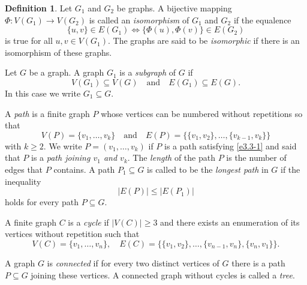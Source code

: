 \documentclass[11pt]{article}
\theoremstyle{definition}
\newtheorem{definition}[theorem]{Definition}
\theoremstyle{remark}
\numberwithin{equation}{section}
\begin{document}
 

\begin{definition}\label{776dcg}
Let $G_1$ and $G_2$ be graphs. A bijective mapping \linebreak
$\Phi \colon V(G_1)\to V(G_2)$
is called an {\it isomorphism} of $G_1$ and $G_2$ if the equalence 
\begin{equation*}
\{u,v\}\in E(G_1)\iff \{\Phi (u),\Phi (v)\}\in E(G_2)
\end{equation*}
is true for all $u,v\in V(G_1)$. 
The graphs are said to be  {\it isomorphic} if there is an isomorphism of these graphs.
\end{definition}





Let $G$ be a graph.
A graph \(G_1\) is a \emph{subgraph} of \(G\) if
\[
V(G_1) \subseteq V(G) \quad \text{and} \quad E(G_1) \subseteq E(G).
\]
In this case we  write \(G_1 \subseteq G\). 




A \emph{path} is a finite graph \(P\) whose vertices can be numbered without repetitions so that
\begin{equation}\label{e3.3-1}
V(P) = \{v_1, \ldots, v_k\} \quad \text{and} \quad E(P) = \{\{v_1, v_2\}, \ldots, \{v_{k-1}, v_k\}\}
\end{equation}
with \(k \geqslant 2\). We write \(P = (v_1, \ldots, v_k)\)  if \(P\) is a path satisfying \eqref{e3.3-1} and said that \(P\) is a \emph{path joining \(v_1\) and \(v_k\)}. 
The {\it length} of the path $P$ is the number of edges that $P$ contains. 
A path $P_1 \subseteq G$ is called to be the {\it longest path} in $G$ if the inequality  
\begin{equation*}
|E(P)| \leq |E(P_1)|
\end{equation*}
holds for every path $P \subseteq G$.







A finite graph $C$ is a \textit{cycle} if $|V(C)|\geq 3$ and there exists an enumeration of its vertices without repetition such that 
\begin{equation*}
    V(C) = \{v_1, \ldots, v_n\}, \quad
E(C) = \{\{v_1, v_2\}, \ldots, \{v_{n-1}, v_n\}, \{v_n, v_1\}\}.
\end{equation*}





A graph \(G\) is \emph{connected} if for every two distinct vertices of \(G\) there is a path \(P \subseteq G\) joining these vertices.
 A connected graph without cycles is called a \textit{tree}.
\end{document}
